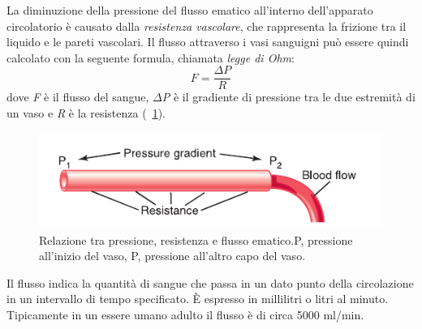 La diminuzione della pressione del flusso ematico all'interno dell'apparato circolatorio è causato dalla \textit{resistenza vascolare}, che rappresenta la frizione tra il liquido e le pareti vascolari. Il flusso attraverso i vasi sanguigni può essere quindi calcolato con la seguente formula, chiamata \textit{legge di Ohm}:
\begin{equation}
	F=\frac{\Delta P}{R}
	\label{eq:OhmsLaw}
\end{equation}
dove \textit{F} è il flusso del sangue, \textit{$\Delta$P} è il gradiente di pressione tra le due estremità di un vaso e \textit{R} è la resistenza  (\Fig~\ref{fig:FlussoSangue}).
\begin{figure}[tb]
	\centering
	\includegraphics[width=0.7\linewidth]{ImageFiles/Fotopletismografia/FlussoSangue}
	\caption{Relazione tra pressione, resistenza e flusso ematico.P, pressione all'inizio del vaso, P, pressione all'altro capo del vaso.}
	\label{fig:FlussoSangue}
\end{figure}
\par Il flusso indica la quantità di sangue che passa in un dato punto della circolazione in un intervallo di tempo specificato. \`E espresso in millilitri o litri al minuto. Tipicamente in un essere umano adulto il flusso è di circa 5000 ml/min.


